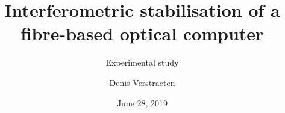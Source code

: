 




\title[Master Thesis]{Interferometric stabilisation of a fibre-based optical computer}
\subtitle{Experimental study}
\author{Denis Verstraeten}
\date{June 28, 2019}



	\begin{frame}[plain]
		\titlepage
	\end{frame}
	
	
	
	

	


	


	
	
	
	
